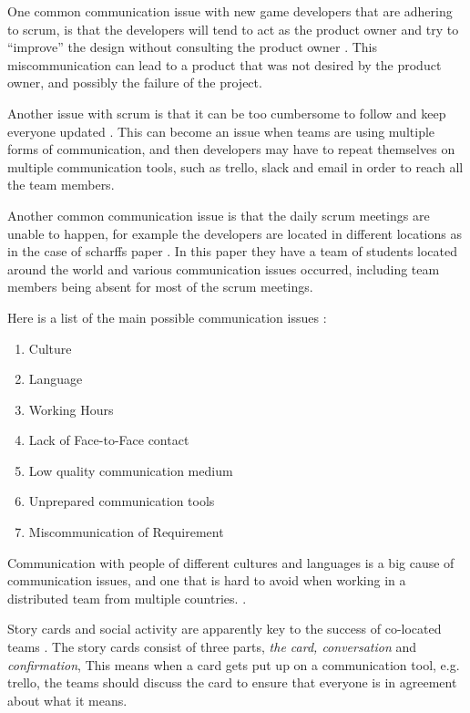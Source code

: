 \documentclass{scrartcl}
\begin{document}
One common communication issue with new game developers that are adhering to scrum, is that the developers will tend to act as the product owner and try to ``improve'' the design without consulting the product owner \cite{krasteva2008}. This miscommunication can lead to a product that was not desired by the product owner, and possibly the failure of the project. \par



Another issue with scrum is that it can be too cumbersome to follow and keep everyone updated \cite{scharff2012}. This can become an issue when teams are using multiple forms of communication, and then developers may have to repeat themselves on multiple communication tools, such as trello, slack and email in order to reach all the team members. \par

Another common communication issue is that the daily scrum meetings are unable to happen, for example the developers are located in different locations as in the case of scharffs paper \cite{scharff2012}. In this paper they have a team of students located around the world and various communication issues occurred, including team members being absent for most of the scrum meetings. 

Here is a list of the main possible communication issues \cite{joshi2013}: 

\begin{enumerate}
\item Culture
\item Language
\item Working Hours
\item Lack of Face-to-Face contact
\item Low quality communication medium
\item Unprepared communication tools
\item Miscommunication of Requirement
\end{enumerate}

Communication with people of different cultures and languages is a big cause of communication issues, and one that is hard to avoid when working in a distributed team from multiple countries. \cite{cohn2003}.

Story cards and social activity are apparently key to the success of co-located teams \cite{abdullah2011}. The story cards consist of three parts, \textit{the card, conversation} and \textit{confirmation}, This means when a card gets put up on a communication tool, e.g. trello, the teams should discuss the card to ensure that everyone is in agreement about what it means. \par
\end{document}
